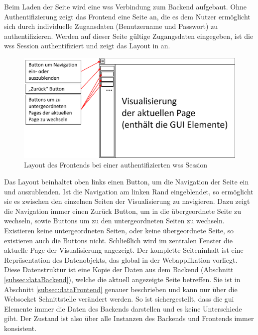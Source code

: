 Beim Laden der Seite wird eine \ac{wss} Verbindung zum Backend aufgebaut.
Ohne Authentifizierung zeigt das Frontend eine Seite an, 
die es dem Nutzer ermöglicht sich durch individuelle Zugansdaten (Benutzername und Passwort) zu authentifizieren. %
Werden auf dieser Seite gültige Zugangsdaten eingegeben, ist die \ac{wss} Session authentifiziert und 
zeigt das Layout in  an.
\begin{figure}[ht]
  \centering
  \includegraphics[width=\textwidth]{content/hauptteil/systemEntwurf/res/LayoutFrontend.pdf}
  \caption[Frontend Layout]{Layout des Frontends bei einer authentifizierten \acs{wss} Session}
  \label{fig:pageLayoutFrontendAuthenticated}
\end{figure}
Das Layout beinhaltet oben links einen Button, um die Navigation der Seite ein und auszublenden.
Ist die Navigation am linken Rand eingeblendet, so ermöglicht sie es zwischen den einzelnen Seiten der Visualisierung zu navigieren.
Dazu zeigt die Navigation immer einen \glqq Zurück\grqq{} Button, um in die übergeordnete Seite zu wechseln, sowie Buttons um zu den untergeordneten Seiten zu wechseln.
Existieren keine untergeordneten Seiten, oder keine übergeordnete Seite, so existieren auch die Buttons nicht.
Schließlich wird im zentralen Fenster die aktuelle Page der Visualisierung angezeigt.
Der komplette Seiteninhalt ist eine Repräsentation des Datenobjekts, das global in der Webapplikation vorliegt.
Diese Datenstruktur ist eine Kopie der Daten aus dem Backend (Abschnitt \ref{subsec:dataBackend}), welche die aktuell angezeigte Seite betreffen.
Sie ist in Abschnitt \ref{subsec:dataFrontend} genauer beschrieben und kann nur über die Websocket Schnittstelle verändert werden. 
So ist sichergestellt, dass die \ac{gui} Elemente immer die Daten des Backends darstellen und es keine Unterschiede gibt.
Der Zustand ist also über alle Instanzen des Backends und Frontends immer konsistent.
